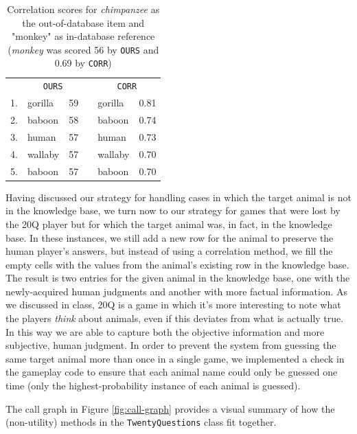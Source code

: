 \documentclass[11pt,a4paper]{article}
\begin{document}
\begin{table}[h]
    \centering
    \begin{tabular}{clcclc}
    \toprule
    & \multicolumn{2}{c}{\texttt{OURS}} && \multicolumn{2}{c}{\texttt{CORR}} \\
    \cmidrule{2-3} \cmidrule{5-6}
    1. & gorilla & 59 && gorilla & 0.81 \\
    2. & baboon & 58 && baboon & 0.74 \\
    3. & human & 57 && human & 0.73 \\
    4. & wallaby & 57 && wallaby & 0.70 \\
    5. & baboon & 57 && baboon & 0.70 \\
    \bottomrule
    \end{tabular}
\caption{Correlation scores for \textit{chimpanzee} as the out-of-database item and "monkey" as in-database reference (\textit{monkey} was scored 56 by \texttt{OURS} and 0.69 by \texttt{CORR})}
\label{tab:corr2}
\end{table}

Having discussed our strategy for handling cases in which the target animal is not in the knowledge base, we turn now to our strategy for games that were lost by the 20Q player but for which the target animal was, in fact, in the knowledge base. 
In these instances, we still add a new row for the animal to preserve the human player's answers, but instead of using a correlation method, we fill the empty cells with the values from the animal's existing row in the knowledge base. 
The result is two entries for the given animal in the knowledge base, one with the newly-acquired human judgments and another with more factual information. 
As we discussed in class, 20Q is a game in which it's more interesting to note what the players \textit{think} about animals, even if this deviates from what is actually true. 
In this way we are able to capture both the objective information and more subjective, human judgment. 
In order to prevent the system from guessing the same target animal more than once in a single game, we implemented a check in the gameplay code to ensure that each animal name could only be guessed one time (only the highest-probability instance of each animal is guessed).  

\vspace{\baselineskip}

\noindent The call graph in Figure \ref{fig:call-graph} provides a visual summary of how the (non-utility) methods in the \texttt{TwentyQuestions} class fit together.
\end{document}
